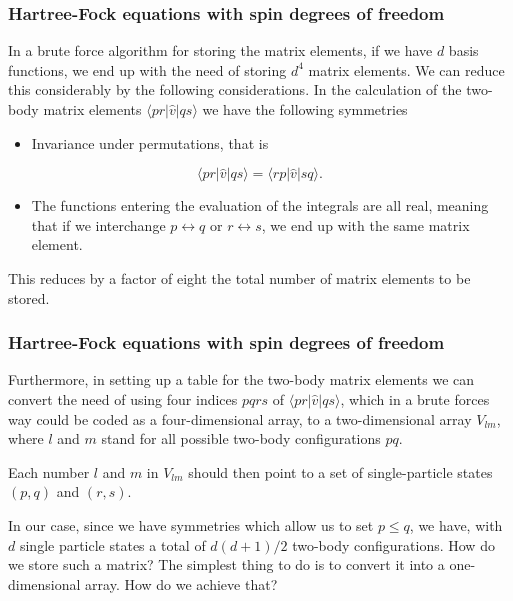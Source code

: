 \documentclass{beamer}
\begin{document}
\begin{frame}
\frametitle{Hartree-Fock equations with spin degrees of freedom}

\begin{block}{}

In a brute force algorithm for storing the matrix elements, if we have $d$ basis functions, we end up with the need of storing 
$d^4$ matrix elements. We can reduce this considerably by the following considerations.
In the calculation of the two-body matrix elements $\langle pr | \hat{v}|qs\rangle$ we have the following symmetries

\begin{itemize}
  \item Invariance under permutations, that is  
\end{itemize}

\noindent
\begin{equation*} \langle pr | \hat{v}|qs\rangle = \langle rp | \hat{v}|sq\rangle.
\end{equation*}
\begin{itemize}
  \item The functions entering the evaluation of the integrals are all real, meaning that if we interchange $p\leftrightarrow q$ or  $r\leftrightarrow s$, we end up with the same matrix element.
\end{itemize}

\noindent
This reduces by a factor of eight the total number of matrix elements to be stored. 
\end{block}
\end{frame}

\begin{frame}
\frametitle{Hartree-Fock equations with spin degrees of freedom}

\begin{block}{}

Furthermore, in setting up a table for the two-body matrix elements we can convert the need of using four indices $pqrs$ of 
$\langle pr | \hat{v}|qs\rangle$, which in a brute forces way could be coded as a four-dimensional array, to 
a two-dimensional array $V_{lm}$, where $l$ and $m$ stand for all possible two-body configurations $pq$.

Each number $l$ and $m$ in $V_{lm}$  should then point to a set of single-particle  states $(p,q)$ and $(r,s)$.  

In our case, since we have 
symmetries which allow us to set $p\le q$, we have, with $d$ single particle states a total of $d(d+1)/2$ two-body configurations.
How do we store such a matrix? The simplest thing to do is to convert it into a one-dimensional array. How do we achieve that? 
\end{block}
\end{frame}
\end{document}
